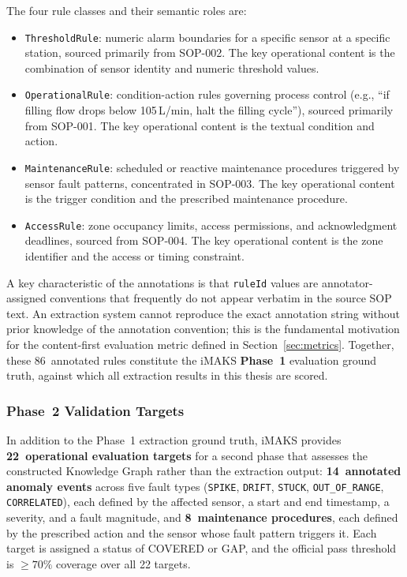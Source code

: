 ﻿\documentclass[11pt]{article}
\begin{document}
The four rule classes and their semantic roles are:
\begin{itemize}
    \item \texttt{ThresholdRule}: numeric alarm boundaries for a specific sensor
          at a specific station, sourced primarily from SOP-002.
          The key operational content is the combination of
          sensor identity and numeric threshold values.
    \item \texttt{OperationalRule}: condition-action rules governing process
          control (e.g., ``if filling flow drops below 105\,L/min, halt the
          filling cycle''), sourced primarily from SOP-001.
          The key operational content is the textual condition and action.
    \item \texttt{MaintenanceRule}: scheduled or reactive maintenance procedures
          triggered by sensor fault patterns, concentrated in SOP-003.
          The key operational content is the trigger condition and the
          prescribed maintenance procedure.
    \item \texttt{AccessRule}: zone occupancy limits, access permissions, and
          acknowledgment deadlines, sourced from SOP-004.
          The key operational content is the zone identifier and the
          access or timing constraint.
\end{itemize}

A key characteristic of the annotations is that \texttt{ruleId} values are
annotator-assigned conventions that frequently do not appear verbatim in the
source SOP text.
An extraction system cannot reproduce the exact annotation string without
prior knowledge of the annotation convention; this is the fundamental motivation
for the content-first evaluation metric defined in
Section~\ref{sec:metrics}.
Together, these 86~annotated rules constitute the iMAKS \textbf{Phase~1} evaluation ground truth, against which all extraction results in this thesis are scored.

\subsubsection{Phase~2 Validation Targets}
\label{sec:phase2_targets}
In addition to the Phase~1 extraction ground truth, iMAKS provides
\textbf{22~operational evaluation targets} for a second phase that assesses
the constructed Knowledge Graph rather than the extraction output:
\textbf{14~annotated anomaly events} across five fault types
(\texttt{SPIKE}, \texttt{DRIFT}, \texttt{STUCK}, \texttt{OUT\_OF\_RANGE},
\texttt{CORRELATED}), each defined by the affected sensor, a start and end
timestamp, a severity, and a fault magnitude, and \textbf{8~maintenance
procedures}, each defined by the prescribed action and the sensor whose
fault pattern triggers it.
Each target is assigned a status of COVERED or GAP, and the official pass
threshold is $\geq 70\%$ coverage over all 22 targets.
\end{document}
